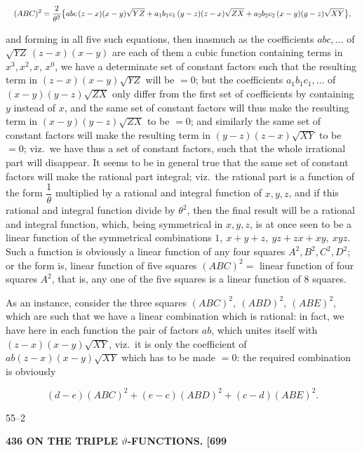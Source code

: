 \documentclass[11pt]{article}
\begin{document}
\[
\resizebox{\textwidth}{!}{$\displaystyle
(ABC)^2 = \frac{2}{\theta^2}\bigl\{abc\,(z-x)(x-y)\sqrt{YZ} + a_1 b_1 c_1\,(y-z)(z-x)\sqrt{ZX} + a_2 b_2 c_2\,(x-y)(y-z)\sqrt{XY}\bigr\},
$}
\]

and forming in all five such equations, then inasmuch as the coefficients $abc, \ldots$ of $\sqrt{YZ}\,(z-x)(x-y)$ are each of them a cubic function containing terms in $x^3, x^2, x$, $x^0$, we have a determinate set of constant factors such that the resulting term in $(z-x)(x-y)\sqrt{YZ}$ will be $=0$; but the coefficients $a_1 b_1 c_1, \ldots$ of $(x-y)(y-z)\sqrt{ZX}$ only differ from the first set of coefficients by containing $y$ instead of $x$, and the same set of constant factors will thus make the resulting term in $(x-y)(y-z)\sqrt{ZX}$ to be $=0$; and similarly the same set of constant factors will make the resulting term in $(y-z)(z-x)\sqrt{XY}$ to be $=0$; viz.\ we have thus a set of constant factors, such that the whole irrational part will disappear. It seems to be in general true that the same set of constant factors will make the rational part integral; viz.\ the rational part is a function of the form $\dfrac{1}{\theta}$ multiplied by a rational and integral function of $x, y, z$, and if this rational and integral function divide by $\theta^2$, then the final result will be a rational and integral function, which, being symmetrical in $x, y, z$, is at once seen to be a linear function of the symmetrical combinations $1,\ x+y+z,\ yz+zx+xy,\ xyz$. Such a function is obviously a linear function of any four squares $A^2, B^2, C^2, D^2$; or the form is, linear function of five squares $(ABC)^2 =$ linear function of four squares $A^2$, that is, any one of the five squares is a linear function of 8 squares.

As an instance, consider the three squares $(ABC)^2,\ (ABD)^2,\ (ABE)^2$, which are such that we have a linear combination which is rational: in fact, we have here in each function the pair of factors $ab$, which unites itself with $(z-x)(x-y)\sqrt{XY}$, viz.\ it is only the coefficient of $ab(z-x)(x-y)\sqrt{XY}$ which has to be made $=0$: the required combination is obviously

\[
(d-e)(ABC)^2 + (e-c)(ABD)^2 + (c-d)(ABE)^2.
\]

\hfill 55--2

\bigskip
\noindent\textbf{436 \hfill ON THE TRIPLE $\vartheta$-FUNCTIONS. \hfill [699}
\end{document}
